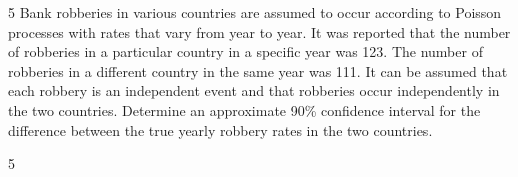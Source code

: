\documentclass[a4paper,12pt]{article}
\begin{document}
5
Bank robberies in various countries are assumed to occur according to Poisson
processes with rates that vary from year to year. It was reported that the number of robberies in a particular country in a specific year was 123. The number of robberies
in a different country in the same year was 111. It can be assumed that each robbery is an independent event and that robberies occur independently in the two countries.
Determine an approximate 90\% confidence interval for the difference between the true yearly robbery rates in the two countries.

\newpage

5
\end{document}
